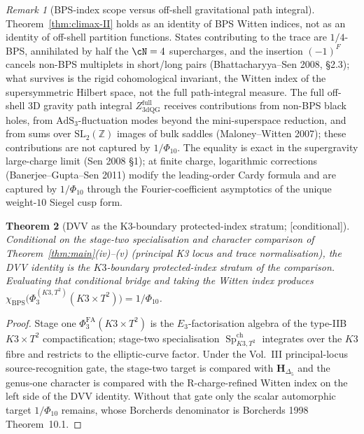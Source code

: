 \documentclass[11pt,reqno]{amsart}
\theoremstyle{plain}
\newtheorem{theorem}{Theorem}[section]
\theoremstyle{definition}
\theoremstyle{remark}
\newtheorem{remark}[theorem]{Remark}
\providecommand{\ClaimStatusConditional}{\textnormal{[conditional]}}
\DeclareMathOperator{\Sp}{Sp}
\newcommand{\AdS}{\mathrm{AdS}}
\newcommand{\Zbb}{\mathbb{Z}}
\newcommand{\bfH}{\mathbf{H}}
\begin{document}
\begin{remark}[BPS-index scope versus off-shell gravitational path integral]
\label{rem:bps-off-shell}
Theorem~\ref{thm:climax-II} holds as an identity of BPS Witten indices, not as an identity of off-shell partition functions. States contributing to the trace are $1/4$-BPS, annihilated by half the $\cN = 4$ supercharges, and the insertion $(-1)^F$ cancels non-BPS multiplets in short/long pairs (Bhattacharyya--Sen 2008, \S2.3); what survives is the rigid cohomological invariant, the Witten index of the supersymmetric Hilbert space, not the full path-integral measure. The full off-shell 3D gravity path integral $Z^{\mathrm{full}}_{\mathrm{3dQG}}$ receives contributions from non-BPS black holes, from $\AdS_3$-fluctuation modes beyond the mini-superspace reduction, and from sums over $\mathrm{SL}_2(\Zbb)$ images of bulk saddles (Maloney--Witten 2007); these contributions are not captured by $1/\Phi_{10}$. The equality is exact in the supergravity large-charge limit (Sen 2008 \S1); at finite charge, logarithmic corrections (Banerjee--Gupta--Sen 2011) modify the leading-order Cardy formula and are captured by $1/\Phi_{10}$ through the Fourier-coefficient asymptotics of the unique weight-$10$ Siegel cusp form.
\end{remark}

\begin{theorem}[DVV as the K3-boundary protected-index stratum; \ClaimStatusConditional]
\label{thm:dvv-as-boundary}
Conditional on the stage-two specialisation and character comparison of Theorem~\ref{thm:main}\textup{(iv)--(v)} (principal K3 locus and trace normalisation), the DVV identity is the $K3$-boundary protected-index stratum of the comparison. Evaluating that conditional bridge and taking the Witten index produces $\chi_{\mathrm{BPS}}\bigl(\Phi_3^{(K3,T^2)}(K3 \times T^2)\bigr) = 1/\Phi_{10}$.
\end{theorem}

\begin{proof}
Stage one $\Phi^{\mathrm{FA}}_3(K3 \times T^2)$ is the $E_3$-factorisation algebra of the type-IIB $K3 \times T^2$ compactification; stage-two specialisation $\Sp^{\mathrm{ch}}_{K3, T^2}$ integrates over the $K3$ fibre and restricts to the elliptic-curve factor. Under the Vol.~III principal-locus source-recognition gate, the stage-two target is compared with $\bfH_{\Delta_5}$ and the genus-one character is compared with the R-charge-refined Witten index on the left side of the DVV identity. Without that gate only the scalar automorphic target $1/\Phi_{10}$ remains, whose Borcherds denominator is Borcherds 1998 Theorem~10.1.
\end{proof}
\end{document}
